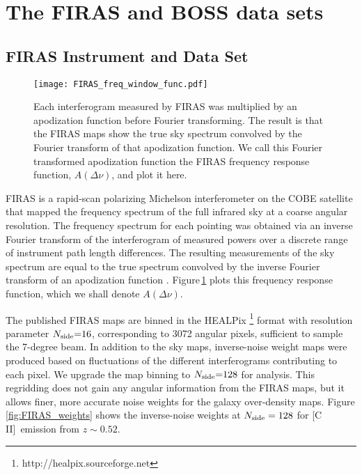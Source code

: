 \documentclass[fleqn,usenatbib]{mnras}
\newcommand{\cii}{[C{\sc\,II}]}
\begin{document}
\section{The FIRAS and BOSS data sets}
\label{sec:FIRAS_and_BOSS_data}

\subsection{FIRAS Instrument and Data Set}
\label{sec:FIRAS}
\begin{figure}
  \texttt{[image: FIRAS\_freq\_window\_func.pdf]}
  \caption{ \label{fig:FIRAS_freq_window_func}Each interferogram measured by FIRAS was multiplied by an apodization function before Fourier transforming. The result is that the FIRAS maps show the true sky spectrum convolved by the Fourier transform of that apodization function. We call this Fourier transformed apodization function the FIRAS frequency response function, $A(\Delta \nu)$, and plot it here. }
\end{figure}
FIRAS is a rapid-scan polarizing Michelson interferometer \citep{mather1993design} on the COBE satellite that mapped the frequency spectrum of the full infrared sky at a coarse angular resolution. The frequency spectrum for each pointing was obtained via an inverse Fourier transform of the interferogram of measured powers over a discrete range of instrument path length differences. The resulting measurements of the sky spectrum are equal to the true spectrum convolved by the inverse Fourier transform of an apodization function \citep{fixsen1994calibration}. Figure\,\ref{fig:FIRAS_freq_window_func} plots this frequency response function, which we shall denote $A(\Delta \nu)$. 

The published FIRAS maps are binned in the HEALPix \footnote{http://healpix.sourceforge.net} \citep{2005ApJ...622..759G, Zonca2019} format with resolution parameter $N_{\rm side}{=}16$, corresponding to 3072 angular pixels, sufficient to sample the 7-degree beam. In addition to the sky maps, inverse-noise weight maps were produced based on fluctuations of the different interferograms contributing to each pixel. We upgrade the map binning to $N_{\rm side}{=}128$ for analysis. This regridding does not gain any angular information from the FIRAS maps, but it allows finer, more accurate noise weights for the galaxy over-density maps. Figure\,\ref{fig:FIRAS_weights} shows the inverse-noise weights at $N_{\rm side}=128$ for \cii\ emission from $z\sim0.52$. 
\end{document}
